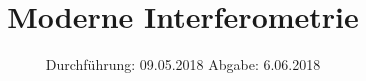 

\subject{V64}
\title{\texorpdfstring{ Moderne Interferometrie}{}}
\date{
	Durchführung: 09.05.2018
	\hspace{4em}
	Abgabe: 6.06.2018
}


	\maketitle
	\newpage
	\tableofcontents
	\newpage
	
	
	
	
	
	
	\newpage

	\printbibliography

